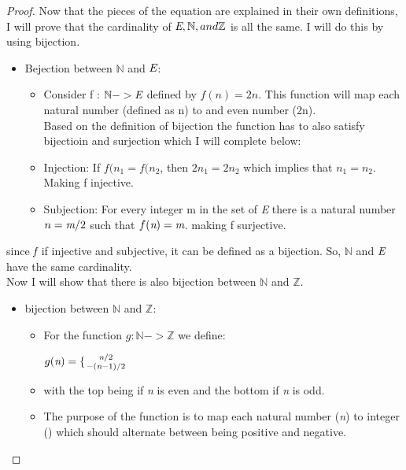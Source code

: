\documentclass[10pt, AMS Euler]{article}
\newcommand{\Z}{\mathbb{Z}}
\newcommand{\N}{\mathbb{N}}
\begin{document}
\begin{enumerate}
\begin{proof}
                    Now that the pieces of the equation are explained in their own definitions, I will prove that the cardinality of $\emph{E}, \N, and \Z$ is all the same. I will do this by using bijection. 
                    \begin{itemize}
                        \item Bejection between $\N$ and $\emph{E}$:
                        \begin{itemize}
                            \item Consider f : $\N -> \emph{E}$ defined by $f(n) = 2n$. This function will map each natural number (defined as n) to and even number (2n).
                            \\ Based on the definition of bijection the function has to also satisfy bijectioin and surjection which I will complete below:
                            \item Injection: If $f(n_{1} = f(n_{2}$, then $2n_{1} = 2n_{2}$ which implies that $n_{1} = n_{2}$. Making f injective. 
                            \item Subjection: For every integer m in the set of \emph{E} there is a natural number $n = \emph{m}/2$ such that $f(\emph{n}) = \emph{m}$. making f surjective. 
                        \end{itemize}   
                    \end{itemize}
                    since $\emph{f}$ if injective and subjective, it can be defined as a bijection. So, $\N$ and $\emph{E}$ have the same cardinality. \\
                    Now I will show that there is also bijection between $\N$ and $\Z$. 
                    \begin{itemize}
                        \item bijection between $\N$ and $\Z$:
                        \begin{itemize}
                            \item For the function $g : \N -> \Z$ we define:
                            \begin{center}
                                $g(\emph{n}) = \{{\emph{n}/2 \atop -(\emph{n}-1)/2}$
                            \end{center}
                            \item with the top being if \emph{n} is even and the bottom if \emph{n} is odd. 
                            \item The purpose of the function is to map each natural number (\emph{n}) to integer (\z) which should alternate between being positive and negative. 

\end{itemize}
\end{itemize}
\end{proof}
\end{enumerate}
\end{document}
